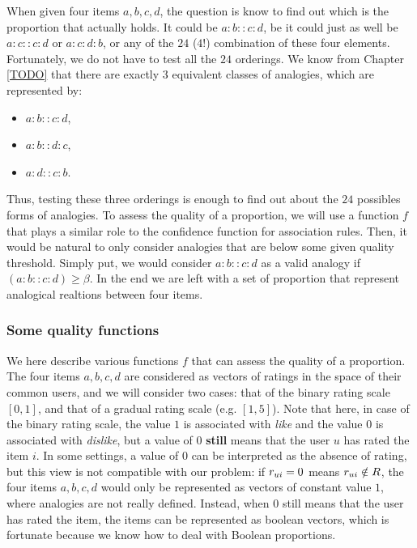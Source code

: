 When given four items $a, b, c, d$, the question is know to find out which is
the proportion that actually holds. It could be $a:b::c:d$, be it could just as
well be $a:c::c:d$ or $a:c:d:b$, or any of the $24$ ($4!$) combination of these
four elements. Fortunately, we do not have to test all the $24$ orderings.
We know from Chapter \ref{TODO} that there are exactly 3 equivalent classes of
analogies, which are represented by:
\begin{itemize}
  \item $a:b::c:d$,
  \item $a:b::d:c$,
  \item $a:d::c:b$.
\end{itemize}
Thus, testing these three orderings is enough to find out about the $24$
possibles forms of analogies. To assess the quality of a proportion, we will
use a function $f$ that plays a similar role to the confidence function for
association rules. Then, it would be natural to only consider analogies that
are below some given quality threshold. Simply put, we would consider
$a:b::c:d$ as a valid analogy if $(a:b::c:d) \geq \beta$. In the end we are
left with a set of proportion that represent analogical realtions between four
items.

\subsubsection{Some quality functions}

We here describe various functions $f$ that can assess the quality of a
proportion. The four items $a, b, c, d$ are considered as vectors of ratings in
the space of their common users,
and we will consider two cases: that of the binary rating scale $[0, 1]$, and  
that of a gradual rating scale (e.g. $[1, 5]$). Note that here, in case of the
binary rating scale, the value $1$ is associated with \textit{like} and the
value $0$ is associated with \textit{dislike}, but a value of $0$
\textbf{still} means that the user $u$ has rated the item $i$. In some
settings, a value of $0$ can be interpreted as the absence of rating, but this
view is not compatible with our problem: if $r_{ui} = 0$ means $r_{ui} \notin R$,
the four items $a, b, c, d$ would only be represented as vectors of constant
value $1$, where analogies are not really defined. Instead, when $0$ still
means that the user has rated the item, the items can be represented as boolean
vectors, which is fortunate because we know how to deal with Boolean
proportions.

